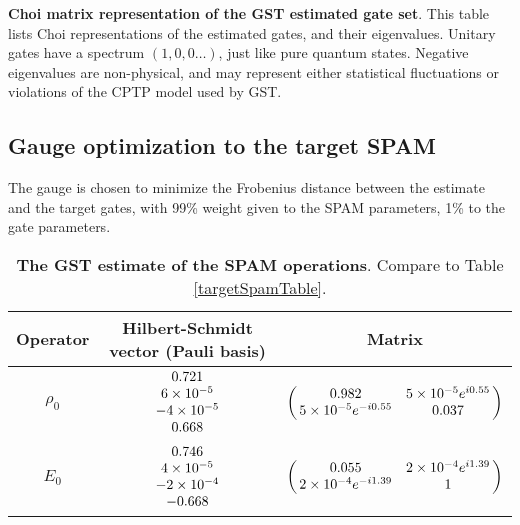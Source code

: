 {\begin{table}[h]
\begin{center}
\caption{\textbf{Choi matrix representation of the GST estimated gate set}.  This table lists Choi representations of the estimated gates, and their eigenvalues.  Unitary gates have a spectrum $(1,0,0\ldots)$, just like pure quantum states.  Negative eigenvalues are non-physical, and may represent either statistical fluctuations or violations of the CPTP model used by GST.\label{bestTargetGatesetChoiTable}}
\end{center}
\end{table}


\clearpage

\subsection{Gauge optimization to the target SPAM}
The gauge is chosen to minimize the Frobenius distance between the estimate and the target gates, with 99\% weight given to the SPAM parameters, 1\% to the gate parameters.

\begin{table}[h]
\begin{center}
\begin{tabular}[l]{|c|c|c|}
\hline
Operator & Hilbert-Schmidt vector (Pauli basis) & Matrix \\ \hline
$\rho_{0}$ & $ \begin{array}{c}
0.721 \\ 
6\times 10^{-5} \\ 
-4\times 10^{-5} \\ 
0.668
 \end{array} $
 & $ \left(\!\!\begin{array}{cc}
0.982 & 5\times 10^{-5}e^{i0.55} \\ 
5\times 10^{-5}e^{-i0.55} & 0.037
 \end{array}\!\!\right) $
 \\ \hline
$E_{0}$ & $ \begin{array}{c}
0.746 \\ 
4\times 10^{-5} \\ 
-2\times 10^{-4} \\ 
-0.668
 \end{array} $
 & $ \left(\!\!\begin{array}{cc}
0.055 & 2\times 10^{-4}e^{i1.39} \\ 
2\times 10^{-4}e^{-i1.39} & 1
 \end{array}\!\!\right) $
 \\ \hline
\end{tabular}

\caption{\textbf{The GST estimate of the SPAM operations}.  Compare to Table \ref{targetSpamTable}.\label{bestTargetSpamGatesetSpamTable}}
\end{center}
\end{table}

}
